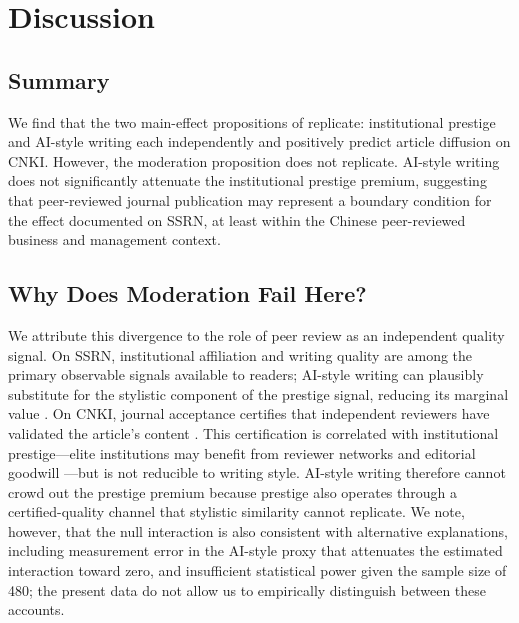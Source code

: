\documentclass[12pt,a4paper]{article}
\begin{document}
\section{Discussion}
\label{sec:discussion}

\subsection{Summary}

We find that the two main-effect propositions of \citet{JoLi2026}
replicate: institutional prestige and AI-style writing each independently
and positively predict article diffusion on CNKI.
However, the moderation proposition does not replicate.
AI-style writing does not significantly attenuate the institutional
prestige premium, suggesting that peer-reviewed journal publication
may represent a boundary condition for the effect documented on SSRN,
at least within the Chinese peer-reviewed business and management context.

\subsection{Why Does Moderation Fail Here?}

We attribute this divergence to the role of peer review as an
independent quality signal.
On SSRN, institutional affiliation and writing quality are among the
primary observable signals available to readers; AI-style writing can
plausibly substitute for the stylistic component of the prestige signal,
reducing its marginal value \citep{JoLi2026}.
On CNKI, journal acceptance certifies that independent reviewers have
validated the article's content \citep{Bornmann2008}.
This certification is correlated with institutional prestige---elite
institutions may benefit from reviewer networks and editorial goodwill
\citep{Lariviere2010}---but is not reducible to writing style.
AI-style writing therefore cannot crowd out the prestige premium because
prestige also operates through a certified-quality channel that
stylistic similarity cannot replicate.
We note, however, that the null interaction is also consistent with
alternative explanations, including measurement error in the AI-style
proxy that attenuates the estimated interaction toward zero, and
insufficient statistical power given the sample size of 480;
the present data do not allow us to empirically distinguish between
these accounts.
\end{document}
